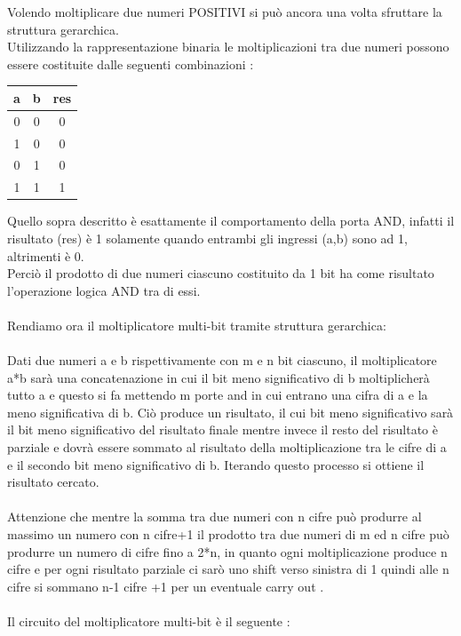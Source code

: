 \documentclass[a4paper]{book}
\begin{document}
Volendo moltiplicare due numeri POSITIVI si può ancora una volta sfruttare la struttura gerarchica.\\
Utilizzando la rappresentazione binaria le moltiplicazioni tra due numeri possono essere costituite dalle seguenti combinazioni :\\
\begin{center}
\begin{tabular}{|c|c|c|}
\hline
a & b & res \\
\hline
0 & 0 & 0 \\
\hline
1 & 0 & 0 \\
\hline
0 & 1 & 0 \\
\hline
1 & 1 & 1 \\
\hline
\end{tabular}
\end{center}
Quello sopra descritto è esattamente il comportamento della porta AND, infatti il risultato (res) è 1 solamente quando entrambi gli ingressi (a,b) sono ad 1, altrimenti è 0.\\
Perciò il prodotto di due numeri ciascuno costituito da 1 bit ha come risultato l'operazione logica AND tra di essi.\\ \\
Rendiamo ora il moltiplicatore multi-bit tramite struttura gerarchica:\\ \\
Dati due numeri a e b rispettivamente con m e n bit ciascuno, il moltiplicatore a*b sarà una concatenazione in cui il bit meno significativo di b moltiplicherà tutto a e questo si fa mettendo m porte and in cui entrano una cifra di a e la meno significativa di b.
Ciò produce un risultato, il cui bit meno significativo sarà il bit meno significativo del risultato finale mentre invece il resto del risultato è parziale e dovrà essere sommato al risultato della moltiplicazione tra le cifre di a e il secondo bit meno significativo di b.
Iterando questo processo si ottiene il risultato cercato.\\ \\
Attenzione che mentre la somma tra due numeri con n cifre può produrre al massimo un numero con n cifre+1 il prodotto tra due numeri di m ed n cifre può produrre un numero di cifre fino a 2*n, in quanto ogni moltiplicazione produce n cifre e per ogni risultato parziale ci sarò uno shift verso sinistra di 1 quindi alle n cifre si sommano n-1 cifre +1 per un eventuale carry out .\\ \\
Il circuito del moltiplicatore multi-bit è il seguente :
\end{document}
